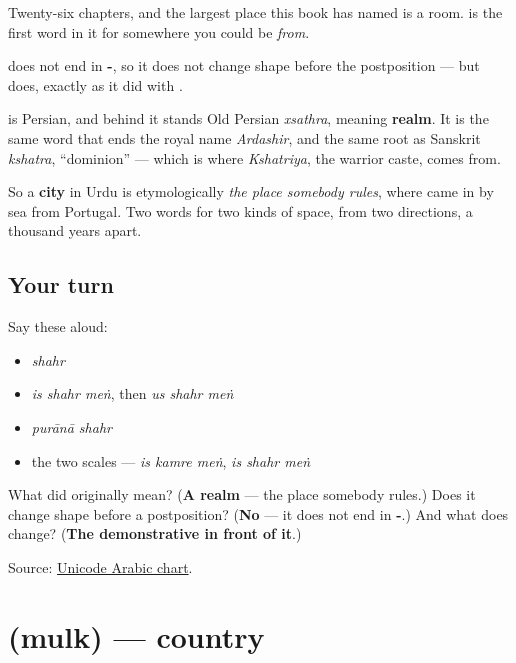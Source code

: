 Twenty-six chapters, and the largest place this book has named is a room. \textbf{} is the first word in it for somewhere you could be \emph{from}.

\textbf{} does not end in \textbf{-}, so it does not change shape before the postposition — but \textbf{} does, exactly as it did with \textbf{}.

\begin{cousinweb}
\textbf{} is Persian, and behind it stands Old Persian \emph{xsathra}, meaning \textbf{realm}. It is the same word that ends the royal name \emph{Ardashir}, and the same root as Sanskrit \emph{kshatra}, \textquotedblleft{}dominion\textquotedblright{} — which is where \emph{Kshatriya}, the warrior caste, comes from.

So a \textbf{city} in Urdu is etymologically \emph{the place somebody rules}, where \textbf{} came in by sea from Portugal. Two words for two kinds of space, from two directions, a thousand years apart.
\end{cousinweb}

\subsection*{Your turn}
Say these aloud:

\begin{itemize}
\raggedright
  \item \emph{shahr}
  \item \emph{is shahr meṅ}, then \emph{us shahr meṅ}
  \item \emph{purānā shahr}
  \item the two scales — \emph{is kamre meṅ}, \emph{is shahr meṅ}
\end{itemize}

\begin{tcolorbox}[breakable,colback=teal!4,colframe=teal!35!black,title={Before you move on}]
What did \textbf{} originally mean? (\textbf{A realm} — the place somebody rules.) Does it change shape before a postposition? (\textbf{No} — it does not end in \textbf{-}.) And what does change? (\textbf{The demonstrative in front of it}.)

Source: \href{https://www.unicode.org/charts/PDF/U0600.pdf}{Unicode Arabic chart}.
\end{tcolorbox}
\section[\texorpdfstring{\ur{ملک} (mulk)}{ملک (mulk)}]{ (mulk) — country}

